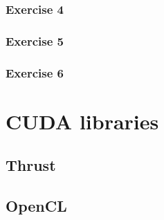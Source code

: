 \documentclass[12px,oz]{report}
\begin{document}
		\subsection{Exercise 4}
		
		
		\subsection{Exercise 5}
		
		\subsection{Exercise 6}
	
\chapter{CUDA libraries}
\label{ch-libraries}


	\section{Thrust}
	\label{sec-thrust}
	
	
	\section{OpenCL}
	\label{sec-opencl}
	

\cite{McCool2012}
\cite{udacity:parallel}



\end{document}
